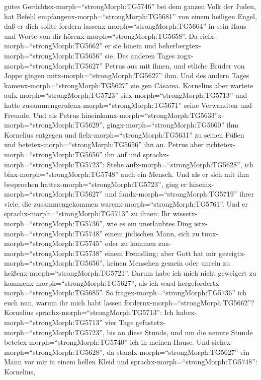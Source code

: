 gutes Gerüchtsx-morph=``strongMorph:TG5746'' bei dem ganzen Volk der
Juden, hat Befehl empfangenx-morph=``strongMorph:TG5681'' von einem
heiligen Engel, daß er dich sollte fordern
lassenx-morph=``strongMorph:TG5664'' in sein Haus und Worte von dir
hörenx-morph=``strongMorph:TG5658''.  Da
riefx-morph=``strongMorph:TG5662'' er sie hinein und
beherbergtex-morph=``strongMorph:TG5656'' sie. Des anderen Tages
zogx-morph=``strongMorph:TG5627'' Petrus aus mit ihnen, und etliche
Brüder von Joppe gingen mitx-morph=``strongMorph:TG5627'' ihm.
 Und des andern Tages kamenx-morph=``strongMorph:TG5627''
sie gen Cäsarea. Kornelius aber wartete
aufx-morph=``strongMorph:TG5723'' siex-morph=``strongMorph:TG5713'' und
hatte zusammengerufenx-morph=``strongMorph:TG5671'' seine Verwandten und
Freunde.  Und als Petrus
hineinkamx-morph=``strongMorph:TG5633''x-morph=``strongMorph:TG5629'',
gingx-morph=``strongMorph:TG5660'' ihm Kornelius entgegen und
fielx-morph=``strongMorph:TG5631'' zu seinen Füßen und
betetex-morph=``strongMorph:TG5656'' ihn an.  Petrus aber
richtetex-morph=``strongMorph:TG5656'' ihn auf und
sprachx-morph=``strongMorph:TG5723'': Stehe
aufx-morph=``strongMorph:TG5628'', ich binx-morph=``strongMorph:TG5748''
auch ein Mensch.  Und als er sich mit ihm besprochen
hattex-morph=``strongMorph:TG5723'', ging er
hineinx-morph=``strongMorph:TG5627'' und
fandx-morph=``strongMorph:TG5719'' ihrer viele, die zusammengekommen
warenx-morph=``strongMorph:TG5761''.  Und er
sprachx-morph=``strongMorph:TG5713'' zu ihnen: Ihr
wissetx-morph=``strongMorph:TG5736'', wie es ein unerlaubtes Ding
istx-morph=``strongMorph:TG5748'' einem jüdischen Mann, sich zu
tunx-morph=``strongMorph:TG5745'' oder zu kommen
zux-morph=``strongMorph:TG5738'' einem Fremdling; aber Gott hat mir
gezeigtx-morph=``strongMorph:TG5656'', keinen Menschen gemein oder
unrein zu heißenx-morph=``strongMorph:TG5721''.  Darum habe
ich mich nicht geweigert zu kommenx-morph=``strongMorph:TG5627'', als
ich ward hergefordertx-morph=``strongMorph:TG5685''. So
fragex-morph=``strongMorph:TG5736'' ich euch nun, warum ihr mich habt
lassen fordernx-morph=``strongMorph:TG5662''?  Kornelius
sprachx-morph=``strongMorph:TG5713'': Ich
habex-morph=``strongMorph:TG5713'' vier Tage
gefastetx-morph=``strongMorph:TG5723'', bis an diese Stunde, und um die
neunte Stunde betetex-morph=``strongMorph:TG5740'' ich in meinen Hause.
Und siehex-morph=``strongMorph:TG5628'', da
standx-morph=``strongMorph:TG5627'' ein Mann vor mir in einem hellen
Kleid  und sprachx-morph=``strongMorph:TG5748'': Kornelius,
